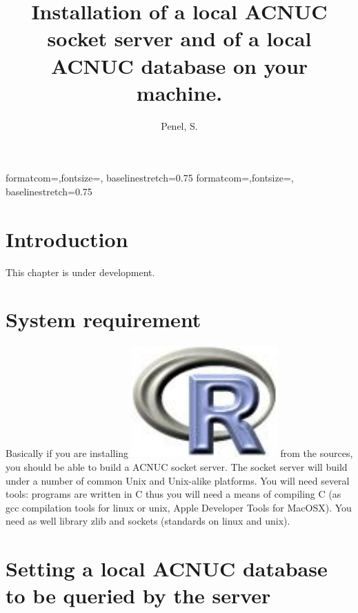 \documentclass{article}
\title{Installation of a local ACNUC socket server and of a local ACNUC database on your machine.}
\author{Penel, S.}
\begin{document}
%
%
{formatcom={\color{Sinput}},fontsize=\footnotesize, baselinestretch=0.75}
{formatcom={\color{Soutput}},fontsize=\footnotesize, baselinestretch=0.75}
%
%
\newcommand{\Rlogo}{\protect\includegraphics[height=1.8ex,keepaspectratio]{../figs/Rlogo.pdf}}
%
%
\newcommand{\seqinr}{\texttt{seqin\bf{R}}}
\newcommand{\Seqinr}{\texttt{Seqin\bf{R}}}
%
%
%
%
%


\maketitle
\tableofcontents



\section{Introduction}

This chapter is under development.

\section{System requirement}

Basically if you are installing \Rlogo{} from the
sources, you should be able to build a ACNUC socket server.
The socket server will build under a number of common Unix and Unix-alike
platforms. You will need several tools: programs are written in C thus 
you will need a
means of compiling C (as gcc compilation tools for linux or unix, Apple
Developer Tools  for MacOSX). You need as well library zlib and sockets
(standards on linux and unix).


\section{Setting a local ACNUC database to be queried by the server}
\end{document}
